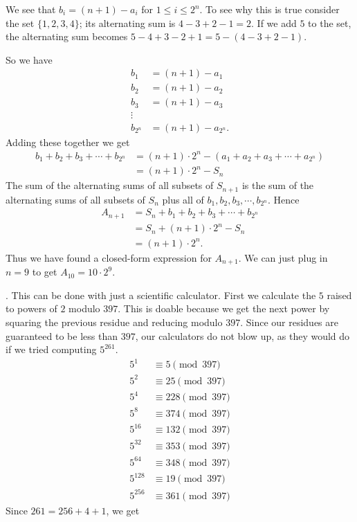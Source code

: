 \documentclass[a4paper,12pt]{article}
\newcounter{questionno}
\newcommand{\question}{\par\noindent\thequestionno.\enspace\refstepcounter{questionno}}
\begin{document}
We see that \(b_i=(n+1)-a_i\) for \(1\le i\le 2^n\). To see why this is true
consider the set \(\{1,2,3,4\}\); its alternating sum is \(4-3+2-1=2\). If we
add \(5\) to the set, the alternating sum becomes \(5-4+3-2+1=5-(4-3+2-1)\).

So we have
\[
	\begin{split}
		b_1&=(n+1)-a_1\\
		b_2&=(n+1)-a_2\\
		b_3&=(n+1)-a_3\\\vdots\\
		b_{2^n}&=(n+1)-a_{2^n}.
	\end{split}
\]
Adding these together we get
\[
	\begin{split}
		b_1+b_2+b_3+\cdots+b_{2^n}&=(n+1)\cdot2^n-(a_1+a_2+a_3+\cdots+ a_{2^n})\\
		&=(n+1)\cdot2^n-S_n
	\end{split}
\]
The sum of the alternating sums of all subsets of \(S_{n+1}\) is the sum of the alternating
sums of all subsets of \(S_n\) plus all of \(b_1,b_2,b_3,\cdots,b_{2^n}\). Hence
\[
	\begin{split}
		A_{n+1}&=S_n+b_1+b_2+b_3+\cdots+b_{2^n}\\
		&=S_n+(n+1)\cdot2^n-S_n\\
		&=(n+1)\cdot2^n.
	\end{split}
\]
Thus we have found a closed-form expression for \(A_{n+1}\). We can just plug in \(n=9\)
to get \(A_{10}=10\cdot2^9.\)
\question
This can be done with just a scientific calculator.
First we calculate the \(5\) raised to powers of \(2\) modulo \(397\).
This is doable because we get the next power by squaring the previous residue
and reducing modulo \(397\). Since our residues are guaranteed to be
less than \(397\), our calculators do not blow up, as they would do
if we tried computing \(5^{261}\).
\[
	\begin{split}
		5^1&\equiv5\pmod{397}\\
		5^2&\equiv25\pmod{397}\\
		5^4&\equiv228\pmod{397}\\
		5^8&\equiv374\pmod{397}\\
		5^{16}&\equiv132\pmod{397}\\
		5^{32}&\equiv353\pmod{397}\\
		5^{64}&\equiv348\pmod{397}\\
		5^{128}&\equiv19\pmod{397}\\
		5^{256}&\equiv361\pmod{397}
	\end{split}
\]
Since \(261=256+4+1\), we get
\end{document}
